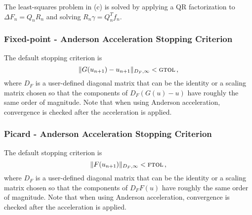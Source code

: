 The least-squares problem in (c) is solved by applying a QR factorization to
$\Delta F_n = Q_n R_n$ and solving $R_n \gamma = Q_n^T f_n$.


\subsubsection*{Fixed-point - Anderson Acceleration Stopping Criterion}

The default stopping criterion is 
\[ \|G(u_{n+1}) - u_{n+1} \|_{D_F,\infty} < \mbox{\sc gtol} \, , \]
where $D_F$ is a user-defined diagonal matrix that can be the identity 
or a scaling matrix chosen so that the components of $D_F (G(u)-u)$ have 
roughly the same order of magnitude.
Note that when using Anderson acceleration, 
convergence is checked after the acceleration is applied.


\subsubsection*{Picard - Anderson Acceleration Stopping Criterion}

The default stopping criterion is 
\[ \|F(u_{n+1})\|_{D_F,\infty} < \mbox{\sc ftol} \, , \]
where $D_F$ is a user-defined diagonal matrix that can be the identity 
or a scaling matrix chosen so that the components of $D_F F(u)$ have 
roughly the same order of magnitude.
Note that when using Anderson acceleration, 
convergence is checked after the acceleration is applied.




